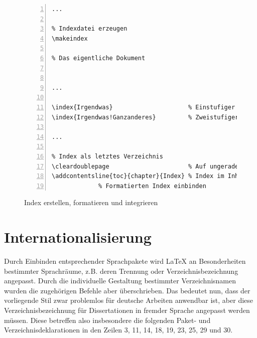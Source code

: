 \begin{figure}[ht]
\centering
\begin{Verbatim}[label=dissertation.tex,numberblanklines=false,fontsize=\scriptsize,numbers=left,frame=single]
...

% Indexdatei erzeugen
\makeindex

% Das eigentliche Dokument


...

\index{Irgendwas}                     % Einstufiger Indexeintrag
\index{Irgendwas!Ganzanderes}         % Zweistufiger Indexeintrag

...

% Index als letztes Verzeichnis
\cleardoublepage                      % Auf ungerader Seite beginnen
\addcontentsline{toc}{chapter}{Index} % Index im Inhaltsverzeichnis anzeigen
             % Formatierten Index einbinden

\end{Verbatim}
\caption{Index erstellen, formatieren und integrieren}\label{indexintegration}
\end{figure}


\section{Internationalisierung}
Durch Einbinden entsprechender Sprachpakete wird \LaTeX{} an
Besonderheiten bestimmter Sprachr\"{a}ume, z.B. deren Trennung oder
Verzeichnisbezeichnung angepasst. Durch die individuelle
Gestaltung bestimmter Verzeichnisnamen wurden die zugeh\"{o}rigen
Befehle aber \"{u}berschrieben. Das bedeutet nun, dass der vorliegende
Stil zwar problemlos f\"{u}r deutsche Arbeiten anwendbar ist, aber
diese Verzeichnisbezeichnung f\"{u}r Dissertationen in fremder Sprache
angepasst werden m\"{u}ssen. Diese betreffen also insbesondere die
folgenden Paket- und Verzeichnisdeklarationen in den Zeilen 3, 11,
14, 18, 19, 23, 25, 29 und 30.

